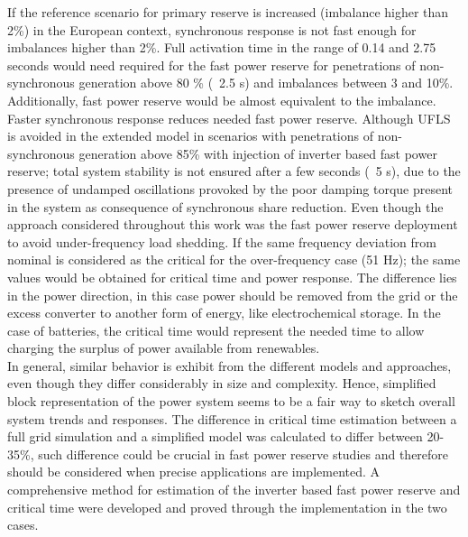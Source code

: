 If the reference scenario for primary reserve is increased (imbalance higher than 2\%) in the European context, synchronous response is not fast enough for imbalances higher than 2\%. Full activation time in the range of 0.14 and 2.75 seconds would need required for the fast power reserve for penetrations of non-synchronous generation above 80 \% (~2.5 s) and imbalances between 3 and 10\%. Additionally, fast power reserve would be almost equivalent to the imbalance. Faster synchronous response reduces needed fast power reserve.
Although UFLS is avoided in the extended model in scenarios with penetrations of non-synchronous generation above 85\% with injection of inverter based fast power reserve; total system stability is not ensured after a few seconds (~5 s), due to the presence of undamped oscillations provoked by the poor damping torque present in the system as consequence of synchronous share reduction. 
Even though the approach considered throughout this work was the fast power reserve deployment to avoid under-frequency load shedding. If the same frequency deviation from nominal is considered as the critical for the over-frequency case (51 Hz); the same values would be obtained for critical time and power response. The difference lies in the power direction, in this case power should be removed from the grid or the excess converter to another form of energy, like electrochemical storage. In the case of batteries, the critical time would represent the needed time to allow charging the surplus of power available from renewables.\\

In general, similar behavior is exhibit from the different models and approaches, even though they differ considerably in size and complexity. Hence, simplified block representation of the power system seems to be a fair way to sketch overall system trends and responses. The difference in critical time estimation between a full grid simulation and a simplified model was calculated to differ between 20-35\%, such difference could be crucial in fast power reserve studies and therefore should be considered when precise applications are implemented. A comprehensive method for estimation of the inverter based fast power reserve and critical time were developed and proved through the implementation in the two cases. 

